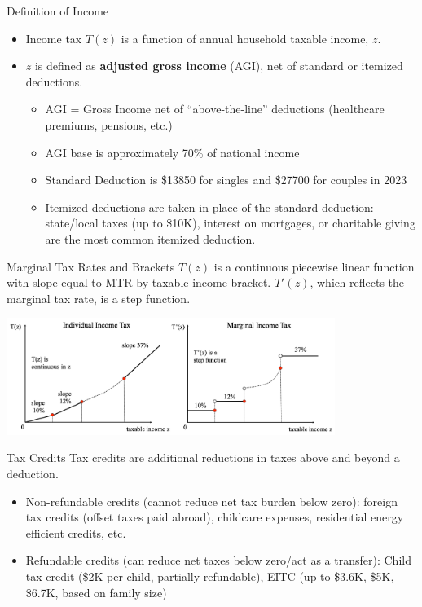 \documentclass[10pt]{extarticle}
\begin{document}
  \begin{problem}{Definition of Income}
    \begin{itemize}
      \item Income tax $T(z)$ is a function of annual household taxable income, $z$.
      \item $z$ is defined as \textbf{adjusted gross income} (AGI), net of standard or itemized deductions.
        \begin{itemize}
          \item AGI = Gross Income net of ``above-the-line'' deductions (healthcare premiums, pensions, etc.)
          \item AGI base is approximately 70\% of national income
          \item Standard Deduction is \$13850 for singles and \$27700 for couples in 2023
          \item Itemized deductions are taken in place of the standard deduction: state/local taxes (up to \$10K), interest on mortgages, or charitable giving are the most common itemized deduction.
        \end{itemize}
    \end{itemize}
  \end{problem}
  \begin{problem}{Marginal Tax Rates and Brackets}
    $T(z)$ is a continuous piecewise linear function with slope equal to MTR by taxable income bracket. $T'(z)$, which reflects the marginal tax rate, is a step function.
    \begin{center}
      \includegraphics[width=0.8\textwidth]{images/MTRs.png}
    \end{center}
  \end{problem}
  \begin{problem}{Tax Credits}
    Tax credits are additional reductions in taxes above and beyond a deduction.
    \begin{itemize}
      \item Non-refundable credits (cannot reduce net tax burden below zero): foreign tax credits (offset taxes paid abroad), childcare expenses, residential energy efficient credits, etc.
      \item Refundable credits (can reduce net taxes below zero/act as a transfer): Child tax credit (\$2K per child, partially refundable), EITC (up to \$3.6K, \$5K, \$6.7K, based on family size)
    \end{itemize}
  \end{problem}
\end{document}
